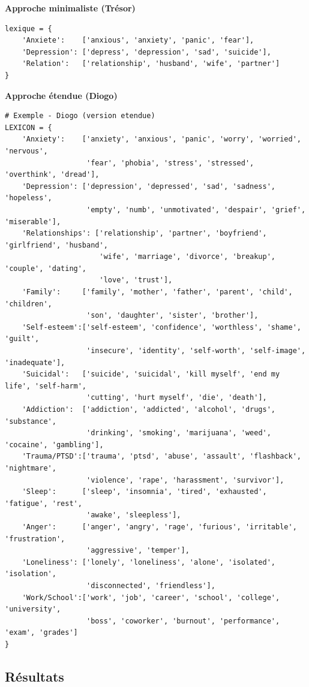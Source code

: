 \documentclass[12pt,a4paper]{article}
\begin{document}
\textbf{Approche minimaliste (Trésor)}
\begin{lstlisting}
lexique = {
    'Anxiete':    ['anxious', 'anxiety', 'panic', 'fear'],
    'Depression': ['depress', 'depression', 'sad', 'suicide'],
    'Relation':   ['relationship', 'husband', 'wife', 'partner']
}
\end{lstlisting}

\textbf{Approche étendue (Diogo)}
\begin{lstlisting}
# Exemple - Diogo (version etendue)
LEXICON = {
    'Anxiety':    ['anxiety', 'anxious', 'panic', 'worry', 'worried', 'nervous',
                   'fear', 'phobia', 'stress', 'stressed', 'overthink', 'dread'],
    'Depression': ['depression', 'depressed', 'sad', 'sadness', 'hopeless',
                   'empty', 'numb', 'unmotivated', 'despair', 'grief', 'miserable'],
    'Relationships': ['relationship', 'partner', 'boyfriend', 'girlfriend', 'husband',
                      'wife', 'marriage', 'divorce', 'breakup', 'couple', 'dating',
                      'love', 'trust'],
    'Family':     ['family', 'mother', 'father', 'parent', 'child', 'children',
                   'son', 'daughter', 'sister', 'brother'],
    'Self-esteem':['self-esteem', 'confidence', 'worthless', 'shame', 'guilt',
                   'insecure', 'identity', 'self-worth', 'self-image', 'inadequate'],
    'Suicidal':   ['suicide', 'suicidal', 'kill myself', 'end my life', 'self-harm',
                   'cutting', 'hurt myself', 'die', 'death'],
    'Addiction':  ['addiction', 'addicted', 'alcohol', 'drugs', 'substance',
                   'drinking', 'smoking', 'marijuana', 'weed', 'cocaine', 'gambling'],
    'Trauma/PTSD':['trauma', 'ptsd', 'abuse', 'assault', 'flashback', 'nightmare',
                   'violence', 'rape', 'harassment', 'survivor'],
    'Sleep':      ['sleep', 'insomnia', 'tired', 'exhausted', 'fatigue', 'rest',
                   'awake', 'sleepless'],
    'Anger':      ['anger', 'angry', 'rage', 'furious', 'irritable', 'frustration',
                   'aggressive', 'temper'],
    'Loneliness': ['lonely', 'loneliness', 'alone', 'isolated', 'isolation',
                   'disconnected', 'friendless'],
    'Work/School':['work', 'job', 'career', 'school', 'college', 'university',
                   'boss', 'coworker', 'burnout', 'performance', 'exam', 'grades']
}
\end{lstlisting}

\pagebreak
\subsection{Résultats}
\end{document}

